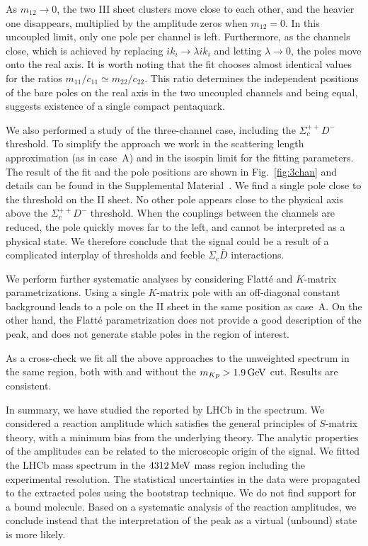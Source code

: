 \documentclass[aps,prl,
twocolumn,nofootinbib,
superscriptaddress,preprintnumbers]{revtex4-1}
\begin{document}
As $m_{12} \to 0$, the two III sheet clusters move close to each other, and the 
 heavier one disappears, multiplied 
  by the amplitude zeros when $m_{12} = 0$. In this uncoupled limit, only one pole per channel is left. 
 Furthermore, as  the channels close, 
which is achieved by replacing $ik_i \to \lambda i k_i$ and letting $\lambda \to 0$, the poles move onto the real axis. It is worth noting that the fit chooses almost identical values for the ratios 
$m_{11}/c_{11}\simeq m_{22}/c_{22}$. 
This ratio 
  determines the independent positions of the bare poles on the real axis  in the two uncoupled channels and being equal, suggests 
   existence of a single compact pentaquark.  

  We also performed a study of the 
   three-channel case, including the $\Sigma_c^{++}D^-$ threshold. 
   To simplify the approach we work in the scattering length approximation (as in case~A)
   and in the isospin limit for the fitting parameters. 
The result of the fit and the pole positions are shown in Fig.~\ref{fig:3chan} and details can be found in the Supplemental Material~\cite{pcjpaclink}.
We find a single pole close to the \SigmaD threshold on the II sheet. 
   No other pole appears close to the physical axis above the $\Sigma_c^{++}D^-$ threshold. 
     When the couplings between the channels are reduced, the
      pole quickly moves far to the left, and cannot be interpreted as a physical state. 
   We therefore conclude that the \Pc signal could be a result of a complicated interplay of thresholds and  feeble $\Sigma_c \bar D$ interactions. 
   
   We perform further systematic analyses by considering Flatt\'e and $K$-matrix parametrizations.  
Using a single $K$-matrix pole with an off-diagonal constant background leads to a pole on the II sheet in the same position as case~A. On the other hand, the Flatt\'e parametrization 
does not provide a good description of the \Pc peak, and does not generate stable poles in the region of interest.
 
As a cross-check we fit all the above approaches to the unweighted \jpsip spectrum in the same region, 
both with and without the $m_{Kp} > 1.9{\mathrm{\,Ge\kern -0.1em V}}$ cut. 
Results are consistent.

  In summary, we have studied the \Pc reported by LHCb in the \jpsip spectrum. We considered a reaction amplitude which satisfies the general principles of $S$-matrix theory, with a minimum bias from the underlying theory. The analytic properties of the amplitudes can be related to the microscopic origin of the signal. We fitted the LHCb mass spectrum in the $4312{\mathrm{\,Me\kern -0.1em V}}$ mass region including the experimental resolution. 
  The statistical uncertainties in the data were propagated to the extracted poles using the
  bootstrap technique. 
 We do not find support for a bound molecule. Based on 
 a systematic analysis of the reaction amplitudes, we conclude instead  
  that the interpretation of the \Pc peak 
   as a virtual (unbound) state is more likely. 
   
\end{document}

